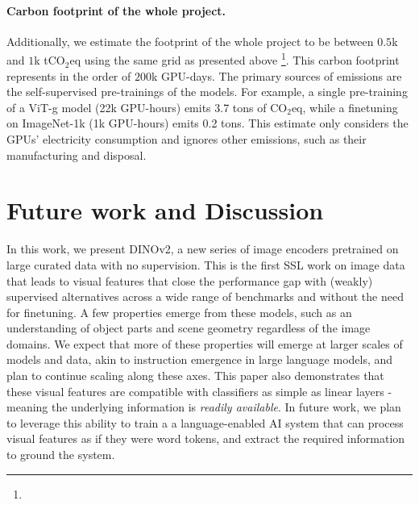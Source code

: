 \paragraph{Carbon footprint of the whole project.} Additionally, we estimate the footprint of the whole project to be between $0.5$k and $1$k tCO$_2$eq using the same grid as presented above \footnote{}. This carbon footprint represents in the order of $200$k GPU-days. The primary sources of emissions are the self-supervised pre-trainings of the models. For example, a single pre-training of a ViT-g model (22k GPU-hours) emits 3.7 tons of CO$_2$eq, while a finetuning on ImageNet-1k (1k GPU-hours) emits 0.2 tons. This estimate only considers the GPUs' electricity consumption and ignores other emissions, such as their manufacturing and disposal.

\section{Future work and Discussion} In this work, we present DINOv2, a new series of image encoders pretrained on large curated data with no supervision. This is the first SSL work on image data that leads to visual features that close the performance gap with (weakly) supervised alternatives across a wide range of benchmarks and without the need for finetuning. 
A few properties emerge from these models, such as an understanding of object parts and scene geometry regardless of the image domains. We expect that more of these properties will emerge at larger scales of models and data, akin to instruction emergence in large language models, and plan to continue scaling along these axes. This paper also demonstrates that these visual features are compatible with classifiers as simple as linear layers - meaning the underlying information is \textit{readily available}. In future work, we plan to leverage this ability to train a a language-enabled AI system that can process visual features as if they were word tokens, and extract the required information to ground the system.

